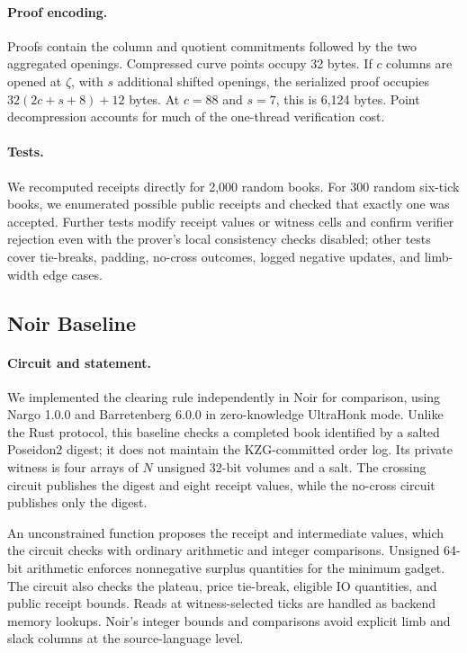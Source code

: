 \paragraph{Proof encoding.} Proofs contain the column and quotient commitments followed by the two aggregated openings. Compressed curve points occupy 32 bytes. If \(c\) columns are opened at \(\zeta\), with \(s\) additional shifted openings, the serialized proof occupies \(32(2c+s+8)+12\) bytes. At \(c=88\) and \(s=7\), this is 6,124 bytes. Point decompression accounts for much of the one-thread verification cost.

\paragraph{Tests.} We recomputed receipts directly for 2,000 random books. For 300 random six-tick books, we enumerated possible public receipts and checked that exactly one was accepted. Further tests modify receipt values or witness cells and confirm verifier rejection even with the prover's local consistency checks disabled; other tests cover tie-breaks, padding, no-cross outcomes, logged negative updates, and limb-width edge cases.

\subsection{Noir Baseline}
\label{app:zq-noir}

\paragraph{Circuit and statement.} We implemented the clearing rule independently in Noir for comparison, using Nargo 1.0.0 and Barretenberg 6.0.0 in zero-knowledge UltraHonk mode. Unlike the Rust protocol, this baseline checks a completed book identified by a salted Poseidon2 digest; it does not maintain the KZG-committed order log. Its private witness is four arrays of \(N\) unsigned 32-bit volumes and a salt. The crossing circuit publishes the digest and eight receipt values, while the no-cross circuit publishes only the digest.

An unconstrained function proposes the receipt and intermediate values, which the circuit checks with ordinary arithmetic and integer comparisons. Unsigned 64-bit arithmetic enforces nonnegative surplus quantities for the minimum gadget. The circuit also checks the plateau, price tie-break, eligible IO quantities, and public receipt bounds. Reads at witness-selected ticks are handled as backend memory lookups. Noir's integer bounds and comparisons avoid explicit limb and slack columns at the source-language level.

